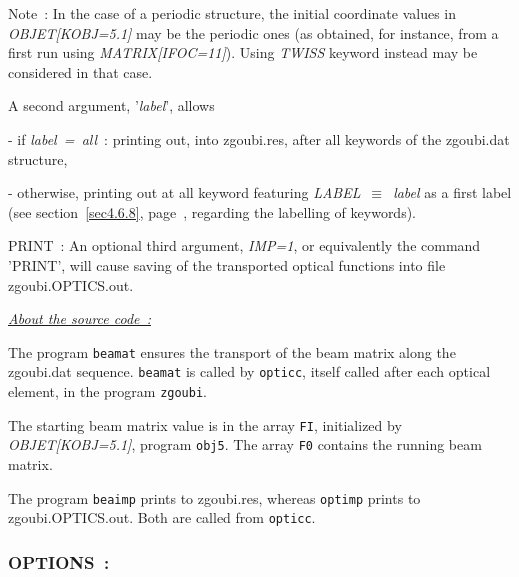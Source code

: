 {\medskip

\noindent  Note~: In the case of a periodic structure, the initial coordinate values  in \textsl{OBJET[KOBJ=5.1]} may 
be  the periodic ones (as obtained, for instance, from a first run using \textsl{MATRIX[IFOC=11]}). 
Using \textsl{TWISS} keyword instead may be considered in that case. 

\bigskip

\noindent A second argument,  '\textsl{label}',  allows 

- if \textsl{label~=~all}~: printing out, into zgoubi.res, after all keywords of the zgoubi.dat structure, 

- otherwise, printing out at all keyword featuring 
\textsl{LABEL}~$\equiv$~\textsl{label} as a first label  (see section~\ref{sec4.6.8}, page~\pageref{sec4.6.8}, regarding  
the labelling of keywords).


 
\bigskip

\noindent PRINT~: 
 An optional third argument, \textsl{IMP=1}, or equivalently the command 'PRINT', 
will cause saving of the transported optical functions into 
file zgoubi.OPTICS.out.


\bigskip


\noindent \underline{\textsl{About the source code~: }}

\medskip

\noindent The program \texttt{beamat} ensures the transport of the beam matrix along the 
zgoubi.dat sequence. \texttt{beamat}  is called by \texttt{opticc}, 
 itself called after each optical element, in the  program \texttt{zgoubi}. 

\smallskip

\noindent The starting beam matrix value is in the array \texttt{FI},  initialized by  \textsl{OBJET[KOBJ=5.1]},  program \texttt{obj5}. 
The array \texttt{F0} contains the running beam matrix. 

\smallskip

\noindent The program \texttt{beaimp} prints to zgoubi.res, whereas  \texttt{optimp} prints to zgoubi.OPTICS.out.  
Both are called from \texttt{opticc}.




\newpage

\subsubsection{OPTIONS~: \OPTIONSTitl} \label{OPTIONS} 

}
